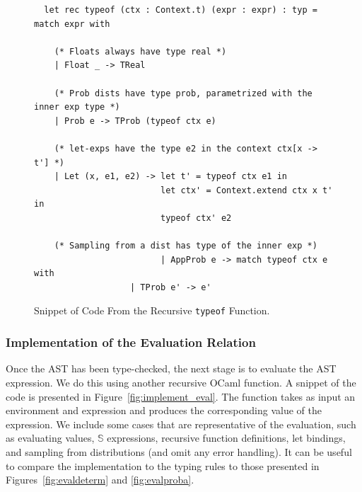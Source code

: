 \documentclass[pageno]{jpaper}
\newcommand{\s}{\mathbb{S}}
\begin{document}
\begin{figure}[hbt]
  \begin{verbatim}
  let rec typeof (ctx : Context.t) (expr : expr) : typ = match expr with

    (* Floats always have type real *)
    | Float _ -> TReal

    (* Prob dists have type prob, parametrized with the inner exp type *)
    | Prob e -> TProb (typeof ctx e)

    (* let-exps have the type e2 in the context ctx[x -> t'] *)
    | Let (x, e1, e2) -> let t' = typeof ctx e1 in
                         let ctx' = Context.extend ctx x t' in
                         typeof ctx' e2
    
    (* Sampling from a dist has type of the inner exp *)                     
                         | AppProb e -> match typeof ctx e with
                   | TProb e' -> e'
\end{verbatim}
  \vspace{-4mm}
  \caption{Snippet of Code From the Recursive \texttt{typeof} Function.}
  \label{fig:typeof}
\end{figure}

\subsubsection{Implementation of the Evaluation Relation} \label{implement_eval}
Once the AST has been type-checked, the next stage is to evaluate the AST expression. We do this using another recursive OCaml function. A snippet of the code is presented in Figure~\ref{fig:implement_eval}. The function takes as input an environment and expression and produces the corresponding value of the expression. We include some cases that are representative of the evaluation, such as evaluating values, $\s$ expressions, recursive function definitions, let bindings, and sampling from distributions (and omit any error handling). It can be useful to compare the implementation to the typing rules to those presented in Figures~\ref{fig:evaldeterm} and \ref{fig:evalproba}.
\end{document}
